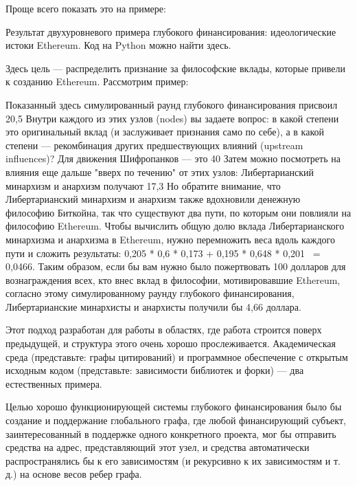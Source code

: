 \documentclass[
    14pt,
    specialist,
    candidate, %
    subf, %
    href,
    dotsinheaders=false
]{disser}
\begin{document}
Проще всего показать это на примере:

Результат двухуровневого примера глубокого финансирования: идеологические истоки Ethereum. Код на Python можно найти здесь.


Здесь цель — распределить признание за философские вклады, которые привели к созданию Ethereum. Рассмотрим пример:

Показанный здесь симулированный раунд глубокого финансирования присвоил 20,5%
Внутри каждого из этих узлов (nodes) вы задаете вопрос: в какой степени это оригинальный вклад (и заслуживает признания само по себе), а в какой степени — рекомбинация других предшествующих влияний (upstream influences)? Для движения Шифропанков — это 40%
Затем можно посмотреть на влияния еще дальше "вверх по течению" от этих узлов: Либертарианский минархизм и анархизм получают 17,3%
Но обратите внимание, что Либертарианский минархизм и анархизм также вдохновили денежную философию Биткойна, так что существуют два пути, по которым они повлияли на философию Ethereum.
Чтобы вычислить общую долю вклада Либертарианского минархизма и анархизма в Ethereum, нужно перемножить веса вдоль каждого пути и сложить результаты: 0,205 * 0,6 * 0,173 + 0,195 * 0,648 * 0,201 ~= 0,0466. Таким образом, если бы вам нужно было пожертвовать 100 долларов для вознаграждения всех, кто внес вклад в философии, мотивировавшие Ethereum, согласно этому симулированному раунду глубокого финансирования, Либертарианские минархисты и анархисты получили бы 4,66 доллара.

Этот подход разработан для работы в областях, где работа строится поверх предыдущей, и структура этого очень хорошо прослеживается. Академическая среда (представьте: графы цитирований) и программное обеспечение с открытым исходным кодом (представьте: зависимости библиотек и форки) — два естественных примера.

Целью хорошо функционирующей системы глубокого финансирования было бы создание и поддержание глобального графа, где любой финансирующий субъект, заинтересованный в поддержке одного конкретного проекта, мог бы отправить средства на адрес, представляющий этот узел, и средства автоматически распространялись бы к его зависимостям (и рекурсивно к их зависимостям и т. д.) на основе весов ребер графа.
\end{document}
